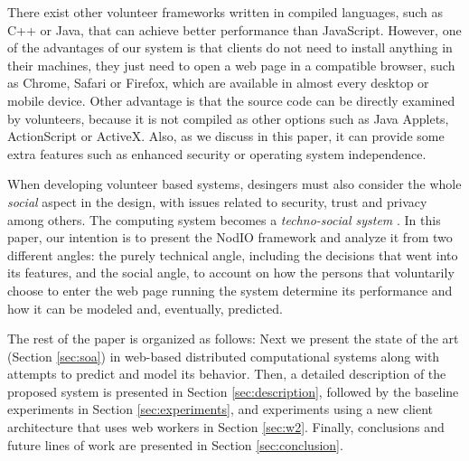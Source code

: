 \documentclass[journal,onecolumn]{IEEEtran}
\begin{document}
There exist other volunteer frameworks written in compiled languages,
such as C++ or Java, that can achieve better performance than
JavaScript. However, one of the advantages of our system is that
clients do not need to install anything in their machines, they just
need to open a web page  
in a compatible browser, such as Chrome, Safari or Firefox, which are
available in almost every desktop or mobile device. Other advantage is
that the source code can be directly examined by volunteers, because it is not
compiled as other options such as Java Applets, ActionScript or
ActiveX.
Also, as we discuss in this paper, it can provide some extra
features such as enhanced security or operating system independence. 


When developing volunteer based systems, desingers must
also consider the whole {\em social} aspect in the design, with
issues related to security, trust and privacy among others. 
The computing system becomes a {\em techno-social system} \cite{vespignani2009predicting}.  
In this paper, our intention is to
present the {\sf NodIO} framework and analyze it from two different
angles: the purely technical angle, including the decisions that went
into its features, and the social angle, to account on how the persons
that voluntarily choose to enter the web page running the system
determine its performance and how it can be modeled and, eventually,
predicted.

The rest of the paper is organized as follows: Next we present the
state of the art (Section \ref{sec:soa}) in web-based distributed
computational systems along with attempts to predict and model its behavior. 
Then, a detailed description of the proposed system is presented
in Section \ref{sec:description}, followed by the baseline experiments
in Section \ref{sec:experiments}, and experiments using a new client
architecture that uses web workers in Section \ref{sec:w2}.
Finally, conclusions and future lines of work are presented in Section
\ref{sec:conclusion}. 
\end{document}
